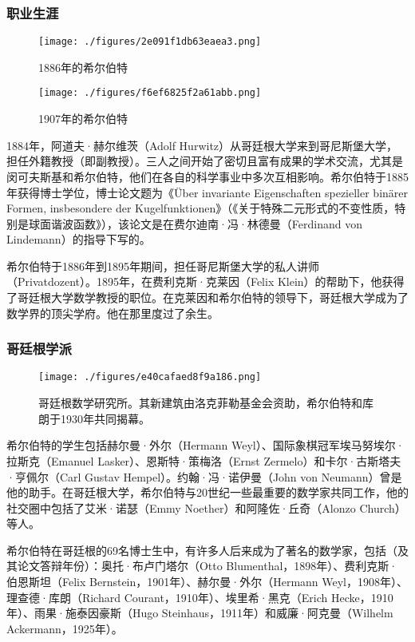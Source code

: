 \subsubsection{职业生涯}
\begin{figure}[ht]
\centering
\texttt{[image: ./figures/2e091f1db63eaea3.png]}
\caption{1886年的希尔伯特} \label{fig_David_2}
\end{figure}
\begin{figure}[ht]
\centering
\texttt{[image: ./figures/f6ef6825f2a61abb.png]}
\caption{1907年的希尔伯特} \label{fig_David_3}
\end{figure}
1884年，阿道夫·赫尔维茨（Adolf Hurwitz）从哥廷根大学来到哥尼斯堡大学，担任外籍教授（即副教授）。三人之间开始了密切且富有成果的学术交流，尤其是闵可夫斯基和希尔伯特，他们在各自的科学事业中多次互相影响。希尔伯特于1885年获得博士学位，博士论文题为《Über invariante Eigenschaften spezieller binärer Formen, insbesondere der Kugelfunktionen》（《关于特殊二元形式的不变性质，特别是球面谐波函数》），该论文是在费尔迪南·冯·林德曼（Ferdinand von Lindemann）的指导下写的。

希尔伯特于1886年到1895年期间，担任哥尼斯堡大学的私人讲师（Privatdozent）。1895年，在费利克斯·克莱因（Felix Klein）的帮助下，他获得了哥廷根大学数学教授的职位。在克莱因和希尔伯特的领导下，哥廷根大学成为了数学界的顶尖学府。他在那里度过了余生。
\subsubsection{哥廷根学派}
\begin{figure}[ht]
\centering
\texttt{[image: ./figures/e40cafaed8f9a186.png]}
\caption{哥廷根数学研究所。其新建筑由洛克菲勒基金会资助，希尔伯特和库朗于1930年共同揭幕。} \label{fig_David_4}
\end{figure}
希尔伯特的学生包括赫尔曼·外尔（Hermann Weyl）、国际象棋冠军埃马努埃尔·拉斯克（Emanuel Lasker）、恩斯特·策梅洛（Ernst Zermelo）和卡尔·古斯塔夫·亨佩尔（Carl Gustav Hempel）。约翰·冯·诺伊曼（John von Neumann）曾是他的助手。在哥廷根大学，希尔伯特与20世纪一些最重要的数学家共同工作，他的社交圈中包括了艾米·诺瑟（Emmy Noether）和阿隆佐·丘奇（Alonzo Church）等人。

希尔伯特在哥廷根的69名博士生中，有许多人后来成为了著名的数学家，包括（及其论文答辩年份）：奥托·布卢门塔尔（Otto Blumenthal，1898年）、费利克斯·伯恩斯坦（Felix Bernstein，1901年）、赫尔曼·外尔（Hermann Weyl，1908年）、理查德·库朗（Richard Courant，1910年）、埃里希·黑克（Erich Hecke，1910年）、雨果·施泰因豪斯（Hugo Steinhaus，1911年）和威廉·阿克曼（Wilhelm Ackermann，1925年）。  

